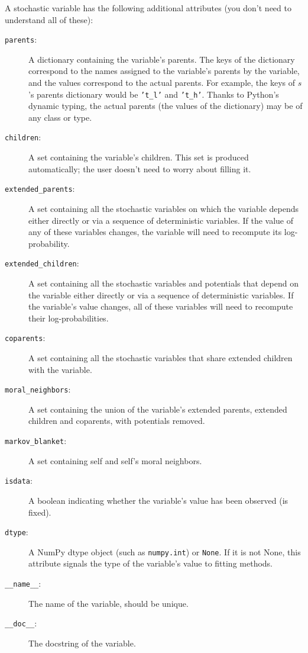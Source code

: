 A stochastic variable has the following additional attributes (you don't need to understand all of these):
\begin{description}
    \item[\texttt{parents}:] A dictionary containing the variable's parents. The keys of the dictionary correspond to the names assigned to the variable's parents by the variable, and the values correspond to the actual parents. For example, the keys of $s$'s parents dictionary would be \texttt{'t_l'} and \texttt{'t_h'}. Thanks to Python's dynamic typing, the actual parents (the values of the dictionary) may be of any class or type.
    \item[\texttt{children}:] A set containing the variable's children. This set is produced automatically; the user doesn't need to worry about filling it.
    \item[\texttt{extended_parents}:] A set containing all the stochastic variables on which the variable depends either directly or via a sequence of deterministic variables. If the value of any of these variables changes, the variable will need to recompute its log-probability.
    \item[\texttt{extended_children}:] A set containing all the stochastic variables and potentials that depend on the variable either directly or via a sequence of deterministic variables. If the variable's value changes, all of these variables will need to recompute their log-probabilities.
    \item[\texttt{coparents}:] A set containing all the stochastic variables that share extended children with the variable.
    \item[\texttt{moral_neighbors}:] A set containing the union of the variable's extended parents, extended children and coparents, with potentials removed.
    \item[\texttt{markov_blanket}:] A set containing self and self's moral neighbors.
    \item[\texttt{isdata}:] A boolean indicating whether the variable's value has been observed (is fixed).
    \item[\texttt{dtype}:] A NumPy dtype object (such as \texttt{numpy.int}) or \texttt{None}. If it is not None, this attribute signals the type of the variable's value to fitting methods.
    \item[\texttt{__name__}:] The name of the variable, should be unique.
    \item[\texttt{__doc__}:] The docstring of the variable.
\end{description}

